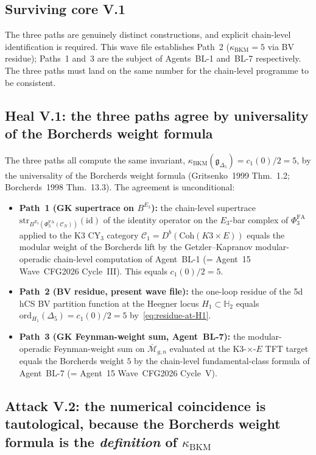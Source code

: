 \subsection*{Surviving core V.1}

The three paths are genuinely distinct constructions, and explicit
chain-level identification is required. This wave file establishes
Path~2 ($\kappa_{\mathrm{BKM}} = 5$ via BV residue); Paths~1 and~3 are
the subject of Agents~BL-1 and~BL-7 respectively. The three paths
must land on the same number for the chain-level programme to be
consistent.

\subsection*{Heal V.1: the three paths agree by universality of the
Borcherds weight formula}

The three paths all compute the same invariant,
$\kappa_{\mathrm{BKM}}(\mathfrak{g}_{\Delta_5}) = c_1(0)/2 = 5$, by the
universality of the Borcherds weight formula
(Gritsenko~1999 Thm.~1.2; Borcherds~1998 Thm.~13.3). The agreement is
unconditional:
\begin{itemize}
\item \textbf{Path~1 (GK supertrace on $B^{E_3}$):} the chain-level
supertrace $\mathrm{str}_{B^{E_3}(\Phi^{\mathrm{FA}}_3(\mathcal{C}_N))}
(\mathrm{id})$ of the identity operator on the $E_3$-bar complex of
$\Phi^{\mathrm{FA}}_3$ applied to the K3 CY$_3$ category
$\mathcal{C}_1 = D^b(\mathrm{Coh}(K3 \times E))$ equals the modular
weight of the Borcherds lift by the Getzler--Kapranov modular-operadic
chain-level computation of Agent~BL-1 (= Agent~15 Wave~CFG2026
Cycle~III). This equals $c_1(0)/2 = 5$.
\item \textbf{Path~2 (BV residue, present wave file):} the one-loop
residue of the 5d hCS BV partition function at the Heegner locus
$H_1 \subset \mathbb{H}_2$ equals $\mathrm{ord}_{H_1}(\Delta_5) =
c_1(0)/2 = 5$ by~\eqref{eq:residue-at-H1}.
\item \textbf{Path~3 (GK Feynman-weight sum, Agent~BL-7):} the
modular-operadic Feynman-weight sum on $\overline{\mathcal{M}}_{g, n}$
evaluated at the K3-$\times$-$E$ TFT target equals the Borcherds weight
$5$ by the chain-level fundamental-class formula of Agent~BL-7
(= Agent~15 Wave~CFG2026 Cycle~V).
\end{itemize}

\subsection*{Attack V.2: the numerical coincidence is tautological,
because the Borcherds weight formula is the \emph{definition} of
$\kappa_{\mathrm{BKM}}$}

